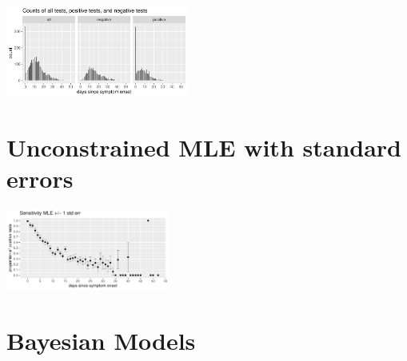 \documentclass[plainboxedsections]{sciposter}
\begin{document}
\begin{multicols}{2}
\begin{center}
  \includegraphics[width=0.45\textwidth]{img/data-counts.pdf}
\end{center}

\section{Unconstrained MLE with standard errors}


\begin{center}
\includegraphics[width=0.4\textwidth]{img/mle.pdf}
\end{center}

\columnbreak

\section{Bayesian Models}
\newcommand{\ilogit}{\textrm{logit}^{-1}}


\end{multicols}
\end{document}
